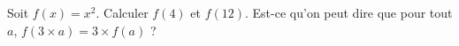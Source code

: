 
\begin{exercice}\label{exosmath-0179}

    Soit \( f(x)=x^2\). Calculer \( f(4)\) et \( f(12)\). Est-ce qu'on peut dire que pour tout \( a\), \( f(3\times a)=3\times f(a)\) ?

\end{exercice}
